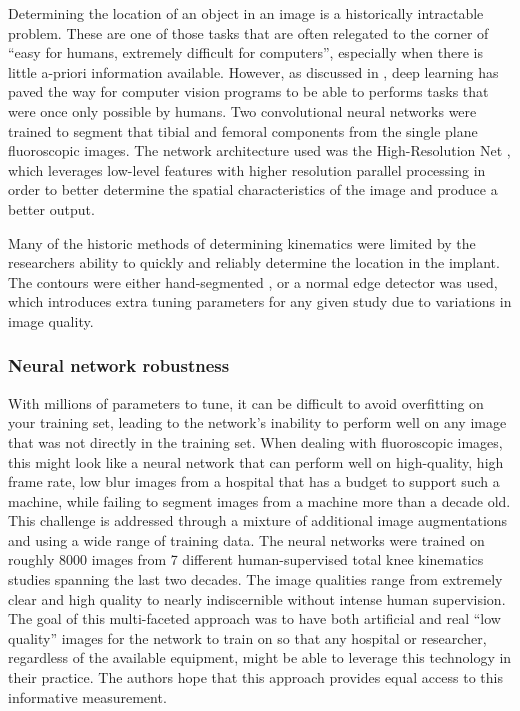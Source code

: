 Determining the location of an object in an image is a historically intractable problem.
These are one of those tasks that are often relegated to the corner of ``easy for humans, extremely difficult for computers'', especially when there is little a-priori information available.
However, as discussed in , deep learning has paved the way for computer vision programs to be able to performs tasks that were once only possible by humans.
Two convolutional neural networks were trained to segment that tibial and femoral components from the single plane fluoroscopic images.
The network architecture used was the High-Resolution Net \cite{wangDeepHighResolutionRepresentation2020}, which leverages low-level features with higher resolution parallel processing in order to better determine the spatial characteristics of the image and produce a better output.

Many of the historic methods of determining kinematics were limited by the researchers ability to quickly and reliably determine the location in the implant.
The contours were either hand-segmented \cite{banksAccurateMeasurementThreedimensional1996, zuffiModelbasedMethodReconstruction1999}, or a normal edge detector was used, which introduces extra tuning parameters for any given study due to variations in image quality.


\subsubsection{Neural network robustness}
With millions of parameters to tune, it can be difficult to avoid overfitting on your training set, leading to the network's inability to perform well on any image that was not directly in the training set.
When dealing with fluoroscopic images, this might look like a neural network that can perform well on high-quality, high frame rate, low blur images from a hospital that has a budget to support such a machine, while failing to segment images from a machine more than a decade old.
This challenge is addressed through a mixture of additional image augmentations \cite{buslaevAlbumentationsFastFlexible2020} and using a wide range of training data.
The neural networks were trained on roughly 8000 images from 7 different human-supervised total knee kinematics studies spanning the last two decades.
The image qualities range from extremely clear and high quality to nearly indiscernible without intense human supervision.
The goal of this multi-faceted approach was to have both artificial and real ``low quality'' images for the network to train on so that any hospital or researcher, regardless of the available equipment, might be able to leverage this technology in their practice.
The authors hope that this approach provides equal access to this informative measurement.
